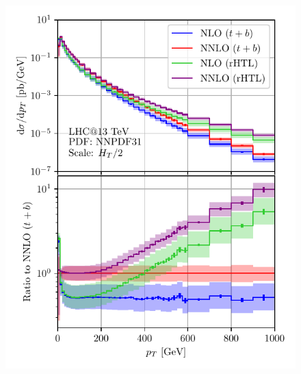 \begin{figure}[h]
\begin{minipage}[t]{0.49\textwidth}
  \includegraphics[width=\textwidth]{Images/pT_13000_bMS_tOS_cropped.pdf}
\end{minipage}
\begin{minipage}[t]{0.49\textwidth}

\end{minipage}
\end{figure}

